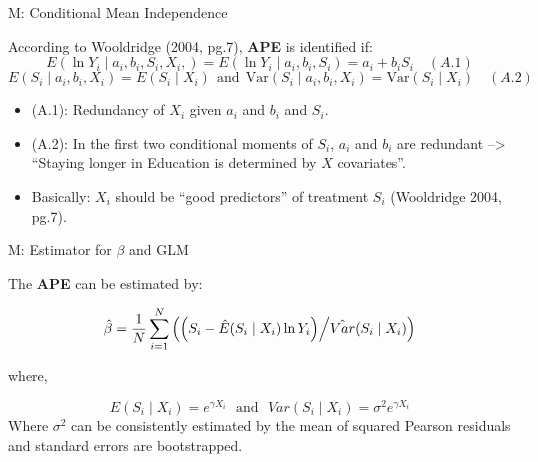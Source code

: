 \documentclass[10pt,ignorenonframetext,]{beamer}
\providecommand{\tightlist}{%
  \setlength{\itemsep}{0pt}\setlength{\parskip}{0pt}}
\begin{document}
\begin{frame}{M: Conditional Mean Independence}
\protect\hypertarget{m-conditional-mean-independence}{}

According to Wooldridge (2004, pg.7), \textbf{APE} is identified if:
\[E (\ln Y_i \mid a_i, b_i, S_i, X_i,) = E (\ln Y_i \mid a_i, b_i, S_i) = a_i+b_i S_i \quad (A.1)\]
\[E(S_i \mid a_i, b_i, X_i) = E(S_i \mid X_i) ~~\text{and}~~ \mathrm{Var}(S_i \mid 
a_i, b_i, X_i) = \mathrm{Var} (S_i \mid X_i) \quad (A.2)\]

\begin{itemize}
\tightlist
\item
  (A.1): Redundancy of \(X_i\) given \(a_i\) and \(b_i\) and \(S_i\).
\item
  (A.2): In the first two conditional moments of \(S_i\), \(a_i\) and
  \(b_i\) are redundant --\textgreater{} ``Staying longer in Education
  is determined by \(X\) covariates''.
\item
  Basically: \(X_i\) should be ``good predictors'' of treatment \(S_i\)
  (Wooldridge 2004, pg.7).
\end{itemize}

\end{frame}

\begin{frame}{M: Estimator for \(\beta\) and GLM}
\protect\hypertarget{m-estimator-for-beta-and-glm}{}

The \textbf{APE} can be estimated by:

\[\hat \beta = \frac{1}{N} \sum_{i=1}^N \left( \left( S_i - \hat E (S_i \mid X_i) \ln Y_i \right) \middle/
\hat{Var}(S_i \mid X_i)\right)\]

where,

\[E(S_i \mid X_i ) = e^{\gamma X_i}  ~~~\text{and}~~~ Var(S_i \mid X_i ) = \sigma^2e^{\gamma X_i}\]
Where \(\sigma^2\) can be consistently estimated by the mean of squared
Pearson residuals and standard errors are bootstrapped.

\end{frame}
\end{document}
